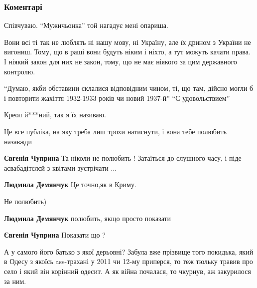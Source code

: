  
 
 
 
 
\subsubsection{Коментарі}

\begin{itemize} %
Співчуваю. \enquote{Мужичьонка} той нагадує мені опариша.


Вони всі ті так не люблять ні нашу мову, ні Україну, але їх дрином з України не
вигониш. Тому, що в раші вони будуть ніким і ніхто, а тут можуть качати права. І
ніякий закон для них не закон, тому, що не має ніякого за цим державного
контролю.



\enquote{Думаю, якби обставини склалися відповідним чином, ті, що там, дійсно могли б і
повторити жахіття 1932-1933 років чи новий 1937-й} 
\enquote{С удовольствием}

Креол й***ний, так я їх називаю.

Це все публіка, на яку треба лиш трохи натиснути, і вона тебе полюбить назавжди

\begin{itemize} %
\textbf{Євгенія Чуприна}
Та ніколи не полюбить !
Затаїться до слушного часу, і піде асвабадітєлєй з квітами зустрічати ...

\textbf{Людмила Демянчук} Це точно,як в Криму.

Не полюбить)

\textbf{Людмила Демянчук} полюбить, якщо просто показати

\textbf{Євгенія Чуприна}
Показати що ?
\end{itemize} %


А у самого його батько з якої дерьовні? Забула вже прізвище того покидька, який
в Одесу з якоїсь ass-трахані у 2011 чи 12-му приперся, то теж тюльку травив про
село і який він корінний одесит. А як війна почалася, то чкурнув, аж закурилося
за ним.



\end{itemize}
